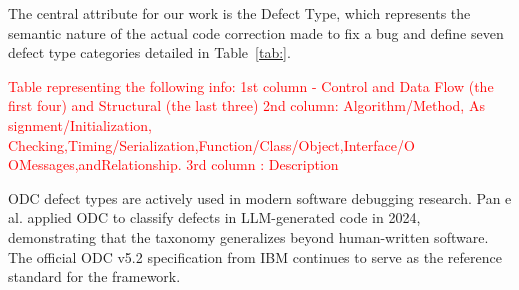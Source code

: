 The central attribute for our work is the Defect Type, which represents the semantic nature of the actual code correction made to fix a bug and define seven defect type categories  detailed in Table~\ref{tab:}.

\textcolor{red}{Table representing the following info: 1st column - Control and Data Flow (the first four) and Structural (the last three) 2nd column:  Algorithm/Method, As
signment/Initialization, Checking,Timing/Serialization,Function/Class/Object,Interface/O
OMessages,andRelationship. 3rd column : Description}


ODC defect types are actively used in modern software debugging research. Pan e al.\citep{esfahani2024understanding} applied ODC to classify defects in LLM-generated code in 2024, demonstrating that the taxonomy generalizes beyond human-written software. The official ODC v5.2 specification from IBM \citep{ibm2013odc} continues to serve as the reference standard for the framework.


